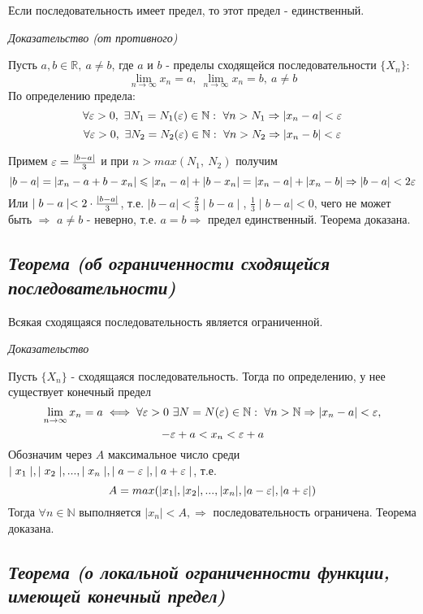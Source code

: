 Если последовательность имеет предел, то этот предел - единственный.

\textit{Доказательство (от противного)}

Пусть $a, b \in \mathbb{R}, \ a \neq b$, где $a$ и $b$ - пределы сходящейся последовательности $\{X_n\}$: $$\lim\limits_{n \to \infty} x_n = a,\ \lim\limits_{n \to \infty} x_n = b, \ a \neq b$$ По определению предела: $$\forall {\large\varepsilon} > 0, \ \exists N_1 = N_1({\large\varepsilon}) \in \mathbb{N} : \ \forall n > N_1 \Rightarrow  | x_n - a|  < {\large\varepsilon} $$ $$\forall {\large\varepsilon} > 0, \ \exists N_2 = N_2({\large\varepsilon}) \in \mathbb{N} : \ \forall n > N_2 \Rightarrow  | x_n - b|  < {\large\varepsilon} $$

Примем ${\large\varepsilon} = {\large\frac{\mid  b - a\mid  }{3}}$ и при $n > max(N_1, \ N_2)$ получим $$| b - a|  = | x_n - a + b - x_n|  \leqslant | x_n - a|  + | b - x_n|  = | x_n - a|  + | x_n - b|  \Rightarrow | b - a|  < 2{\large\varepsilon}$$ Или $\mid  b-a\mid   < 2 \cdot {\large\frac{\mid  b - a\mid  }{3}}$, т.е. $\mid  b-a\mid   < \frac{2}{3}\mid  b - a\mid  $, $\frac{1}{3}\mid  b-a\mid   < 0$, чего не может быть $\Rightarrow$ $a \neq b$ - неверно, т.е. $a = b \Rightarrow$ предел единственный. Теорема доказана.
\subsection{\textit{Теорема (об ограниченности сходящейся последовательности)}}

Всякая сходящаяся последовательность является ограниченной.

\textit{Доказательство}

Пусть $\{X_n\}$ - сходящаяся последовательность. Тогда по определению, у нее существует конечный предел $$\lim\limits_{n \to \infty}x_n = a \iff \forall {\large\varepsilon} > 0 \ \exists N = N({\large\varepsilon})\in \mathbb{N}: \ \forall n > \mathbb{N} \Rightarrow | x_n - a|  < {\large\varepsilon},$$ $$-{\large\varepsilon}+a < x_n < {\large\varepsilon} + a$$ Обозначим через $A$ максимальное число среди $\mid  x_1\mid  , \mid  x_2\mid  , ..., \mid  x_n\mid  , \mid  a-{\large\varepsilon}\mid  , \mid  a + {\large\varepsilon}\mid  $, т.е. $$A = max(| x_1| , | x_2| , ..., | x_n| , | a-{\large\varepsilon}| , | a + {\large\varepsilon}| )$$ Тогда $\forall n \in \mathbb{N}$ выполняется $\mid  x_n\mid   < A, \Rightarrow$ последовательность ограничена. Теорема доказана.
\subsection{\textit{Теорема (о локальной ограниченности функции, имеющей конечный предел)}}

